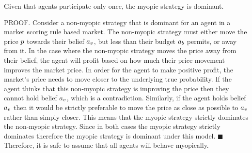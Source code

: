 \begin{lemma}
Given that agents participate only once, the myopic strategy is dominant. 
\end{lemma}
PROOF. Consider a non-myopic strategy that is dominant for an agent in a market scoring rule based market. The non-myopic strategy must either move the price $p$ towards their belief $a_v$, but less than their budget $a_b$ permits, or away from it. In the case where the non-myopic strategy moves the price away from their belief, the agent will profit based on how much their price movement improves the market price. In order for the agent to make positive profit, the market's price needs to move closer to the underlying true probability. If the agent thinks that this non-myopic strategy is improving the price then they cannot hold belief $a_v$, which is a contradiction. Similarly, if the agent holds belief $a_v$ then it would be strictly preferable to move the price as close as possible to $a_v$ rather than simply closer. This means that the myopic strategy strictly dominates the non-myopic strategy. Since in both cases the myopic strategy strictly dominates therefore the myopic strategy is dominant under this model. $\blacksquare$\\

Therefore, it is safe to assume that all agents will behave myopically.\\




